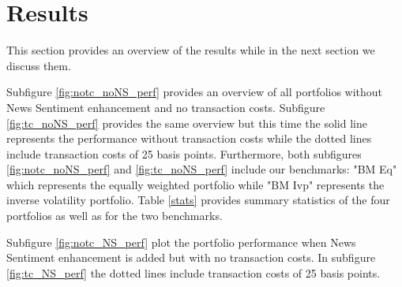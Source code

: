 \section{Results}

This section provides an overview of the results while in the next section we discuss them. 

Subfigure \ref{fig:notc_noNS_perf} provides an overview of all portfolios without News Sentiment enhancement and no transaction costs. Subfigure \ref{fig:tc_noNS_perf} provides the same overview but this time the solid line represents the performance without transaction costs while the dotted lines include transaction costs of 25 basis points. Furthermore, both subfigures \ref{fig:notc_noNS_perf} and \ref{fig:tc_noNS_perf} include our benchmarks: "BM Eq" which represents the equally weighted portfolio while "BM Ivp" represents the inverse volatility portfolio. Table \ref{stats} provides summary statistics of the four portfolios as well as for the two benchmarks.

Subfigure \ref{fig:notc_NS_perf} plot the portfolio performance when News Sentiment enhancement is added but with no transaction costs. In subfigure \ref{fig:tc_NS_perf} the dotted lines include transaction costs of 25 basis points. 


